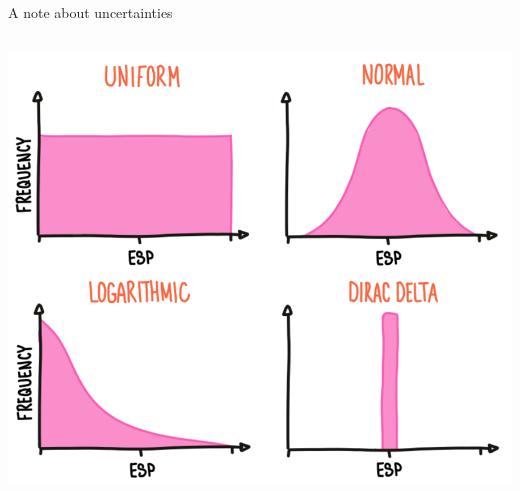 \documentclass[10pt,aspectratio=169]{beamer}
\begin{document}
\begin{frame}{A note about uncertainties}
{\begin{columns}[T]
\begin{column}{0.55\textwidth}
        \centering \includegraphics[width=1\textwidth]{../docs/img/ESP/ESP-distributions.png}
    \end{column}
  \end{columns}
  }
\end{frame}
\end{document}
